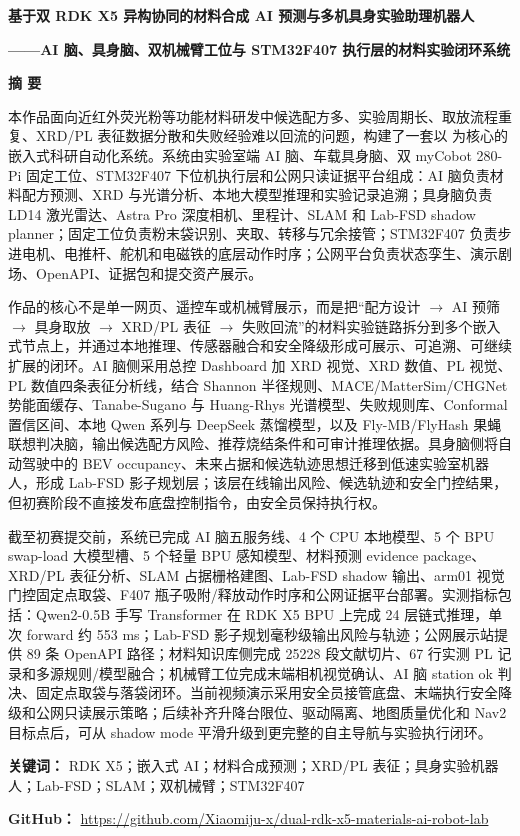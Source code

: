 \thispagestyle{empty}
\vspace*{0.2em}
{\centering
{\LARGE\bfseries 基于双 RDK X5 异构协同的材料合成 AI 预测与多机具身实验助理机器人}\par
\vspace{0.5em}
{\large\bfseries ——AI 脑、具身脑、双机械臂工位与 STM32F407 执行层的材料实验闭环系统}\par
}
\vspace{1.1em}

\begin{center}
  \textbf{\large 摘 \quad 要}
\end{center}

本作品面向近红外荧光粉等功能材料研发中候选配方多、实验周期长、取放流程重复、XRD/PL 表征数据分散和失败经验难以回流的问题，构建了一套以 为核心的嵌入式科研自动化系统。系统由实验室端 AI 脑、车载具身脑、双 myCobot 280-Pi 固定工位、STM32F407 下位机执行层和公网只读证据平台组成：AI 脑负责材料配方预测、XRD 与光谱分析、本地大模型推理和实验记录追溯；具身脑负责 LD14 激光雷达、Astra Pro 深度相机、里程计、SLAM 和 Lab-FSD shadow planner；固定工位负责粉末袋识别、夹取、转移与冗余接管；STM32F407 负责步进电机、电推杆、舵机和电磁铁的底层动作时序；公网平台负责状态孪生、演示剧场、OpenAPI、证据包和提交资产展示。

作品的核心不是单一网页、遥控车或机械臂展示，而是把“配方设计 $\rightarrow$ AI 预筛 $\rightarrow$ 具身取放 $\rightarrow$ XRD/PL 表征 $\rightarrow$ 失败回流”的材料实验链路拆分到多个嵌入式节点上，并通过本地推理、传感器融合和安全降级形成可展示、可追溯、可继续扩展的闭环。AI 脑侧采用总控 Dashboard 加 XRD 视觉、XRD 数值、PL 视觉、PL 数值四条表征分析线，结合 Shannon 半径规则、MACE/MatterSim/CHGNet 势能面缓存、Tanabe-Sugano 与 Huang-Rhys 光谱模型、失败规则库、Conformal 置信区间、本地 Qwen 系列与 DeepSeek 蒸馏模型，以及 Fly-MB/FlyHash 果蝇联想判决脑，输出候选配方风险、推荐烧结条件和可审计推理依据。具身脑侧将自动驾驶中的 BEV occupancy、未来占据和候选轨迹思想迁移到低速实验室机器人，形成 Lab-FSD 影子规划层；该层在线输出风险、候选轨迹和安全门控结果，但初赛阶段不直接发布底盘控制指令，由安全员保持执行权。

截至初赛提交前，系统已完成 AI 脑五服务线、4 个 CPU 本地模型、5 个 BPU swap-load 大模型槽、5 个轻量 BPU 感知模型、材料预测 evidence package、XRD/PL 表征分析、SLAM 占据栅格建图、Lab-FSD shadow 输出、arm01 视觉门控固定点取袋、F407 瓶子吸附/释放动作时序和公网证据平台部署。实测指标包括：Qwen2-0.5B 手写 Transformer 在 RDK X5 BPU 上完成 24 层链式推理，单次 forward 约 553 ms；Lab-FSD 影子规划毫秒级输出风险与轨迹；公网展示站提供 89 条 OpenAPI 路径；材料知识库侧完成 25228 段文献切片、67 行实测 PL 记录和多源规则/模型融合；机械臂工位完成末端相机视觉确认、AI 脑 station ok 判决、固定点取袋与落袋闭环。当前视频演示采用安全员接管底盘、末端执行安全降级和公网只读展示策略；后续补齐升降台限位、驱动隔离、地图质量优化和 Nav2 目标点后，可从 shadow mode 平滑升级到更完整的自主导航与实验执行闭环。

\vspace{0.8em}
\noindent\textbf{关键词：} RDK X5；嵌入式 AI；材料合成预测；XRD/PL 表征；具身实验机器人；Lab-FSD；SLAM；双机械臂；STM32F407

\vspace{0.4em}
\noindent\textbf{GitHub：} \url{https://github.com/Xiaomiju-x/dual-rdk-x5-materials-ai-robot-lab}
